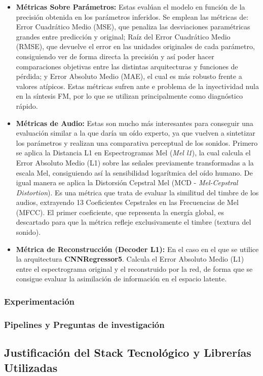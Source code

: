 \documentclass[12pt, a4paper]{article}
\begin{document}
\begin{itemize}

\item \textbf{Métricas Sobre Parámetros: } Estas evalúan el modelo en función de la precisión obtenida
en los parámetros inferidos. Se emplean las métricas de: Error Cuadrático Medio (MSE), que penaliza las desviaciones paramétricas grandes 
entre predicción y original; Raíz del Error Cuadrático Medio (RMSE), que devuelve el error en las unidades originales de cada parámetro, consiguiendo
ver de forma directa la precisión y así poder hacer comparaciones objetivas entre las distintas arquitecturas y funciones de pérdida;
y Error Absoluto Medio (MAE), el cual es más robusto frente a valores atípicos. Estas métricas sufren ante e problema de la inyectividad 
nula en la síntesis FM, por lo que se utilizan principalmente como diagnóstico rápido.

\item \textbf{Métricas de Audio: } Estas son mucho más interesantes para conseguir una evaluación
similar a la que daría un oído experto, ya que vuelven a sintetizar los parámetros y realizan una comparativa
perceptual de los sonidos. Primero se aplica la Distancia L1 en Espectrogramas Mel (\textit{Mel l1}), la cual calcula el 
Error Absoluto Medio (L1) sobre las señales previamente transformadas a la escala Mel, consiguiendo así la sensibilidad logarítmica
del oído humano. De igual manera se aplica la Distorsión Cepstral Mel (MCD - \textit{Mel-Cepstral Distortion}). Es una métrica que trata 
de evaluar la similitud del timbre de los audios, extrayendo 13 Coeficientes Cepstrales en las Frecuencias de Mel (MFCC). 
El primer coeficiente, que representa la energía global, es descartado para que la métrica refleje exclusivamente el timbre (textura del sonido).

\item \textbf{Métrica de Reconstrucción (Decoder L1): } En el caso en el que se utilice la arquitectura
\textbf{CNNRegressor5}. Calcula el Error Absoluto Medio (L1) entre el espectrograma original y el reconstruido por la red,
de forma que se consigue evaluar la asimilación de información en el espacio latente. 

\end{itemize}

\subsubsection{Experimentación}
\subsubsection{Pipelines y Preguntas de investigación}



\subsection{Justificación del Stack Tecnológico y Librerías Utilizadas}
\end{document}
